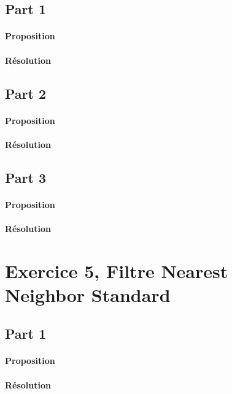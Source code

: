 \documentclass{article}
\begin{document}
\subsection{Part 1}
\paragraph{Proposition}

\paragraph{Résolution}


\subsection{Part 2}
\paragraph{Proposition}

\paragraph{Résolution}


\subsection{Part 3}
\paragraph{Proposition}

\paragraph{Résolution}



\section{Exercice 5, Filtre Nearest Neighbor Standard}
\subsection{Part 1}
\paragraph{Proposition}

\paragraph{Résolution}
\end{document}

